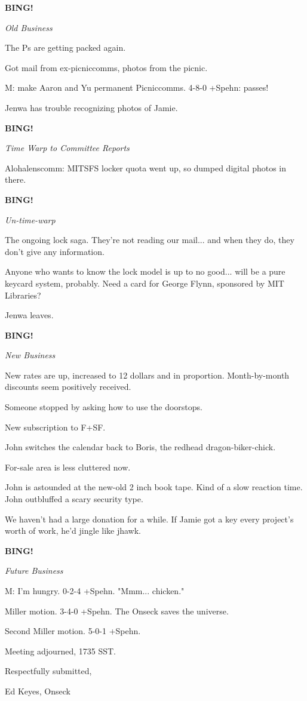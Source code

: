 \documentclass[12pt]{article}
\newcommand{\bing}{{\bf BING!} }
\newcommand{\goto}[1]{\bing \vskip 12pt \centerline{{\em{#1}}}}
\begin{document}
\goto{Old Business}

The Ps are getting packed again.

Got mail from ex-picniccomms, photos from the picnic.

M: make Aaron and Yu permanent Picniccomms. 4-8-0 +Spehn: passes!

Jenwa has trouble recognizing photos of Jamie.

\goto{Time Warp to Committee Reports}

Alohalenscomm: MITSFS locker quota went up, so dumped digital photos in there.

\goto{Un-time-warp}

The ongoing lock saga. They're not reading our mail... and when they do, they don't give any information.

Anyone who wants to know the lock model is up to no good... will be a pure keycard system, probably. Need a card for George Flynn, sponsored by MIT Libraries?

Jenwa leaves.

\goto{New Business}

New rates are up, increased to 12 dollars and in proportion. Month-by-month discounts seem positively received.

Someone stopped by asking how to use the doorstops.

New subscription to F+SF.

John switches the calendar back to Boris, the redhead dragon-biker-chick.

For-sale area is less cluttered now.

John is astounded at the new-old 2 inch book tape. Kind of a slow reaction time. John outbluffed a scary security type.

We haven't had a large donation for a while. If Jamie got a key every project's worth of work, he'd jingle like jhawk.

\goto{Future Business}

M: I'm hungry. 0-2-4 +Spehn. "Mmm... chicken."

Miller motion. 3-4-0 +Spehn. The Onseck saves the universe.

Second Miller motion. 5-0-1 +Spehn.

\vspace{12pt}

\noindent
Meeting adjourned, 1735 SST.

\vspace{18pt}

\centerline{Respectfully submitted,}
\centerline{Ed Keyes, Onseck}
\end{document}
